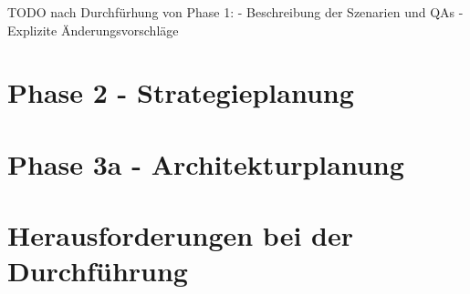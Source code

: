 TODO nach Durchfürhung von Phase 1: 
 - Beschreibung der Szenarien und QAs
 - Explizite Änderungsvorschläge


\section{Phase 2 - Strategieplanung}
\label{sec:durchführung-phase2}

\section{Phase 3a - Architekturplanung}
\section{Herausforderungen bei der Durchführung}
